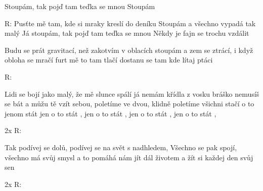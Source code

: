 \resetVars
{}
\MakeHeader
\Lyrics

Stoupám, tak pojď tam teďka se mnou
Stoupám

R:
Pusťte mě tam, kde si mraky kreslí do deníku
Stoupám a všechno vypadá tak malý
Já stoupám, tak pojď tam teďka se mnou
Někdy je fajn se trochu vzdálit

Budu se prát gravitací, než zakotvím v oblacích
stoupám a zem se ztrácí,
i když obloha se mračí furt mě to tam tlačí
dostanu se tam kde lítaj ptáci

R:

Lidi se bojí jako malý, že mě slunce spálí
já nemám křídla z vosku bráško nemusíš se bát
a můžu tě vzít sebou, poletíme ve dvou,
klidně poletíme všichni stačí o to jenom stát
jen o to stát , 
jen o to stát , 
jen o to stát , 
jen o to stát , 

2x R:

Tak podívej se dolů, podívej se na svět s nadhledem, 
Všechno se pak spojí, všechno má svůj smysl a to
pomáhá nám jít dál životem a žít si každej den svůj sen

2x R:

\Next
